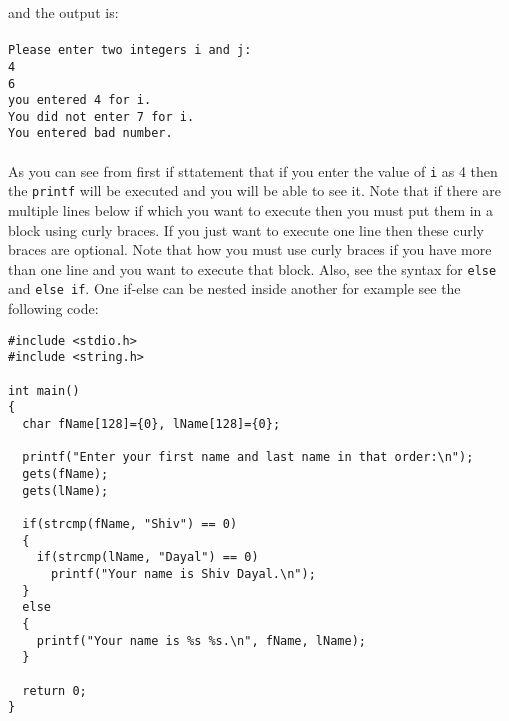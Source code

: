 and the output is:
\\\\\texttt{Please enter two integers i and j:\\
4\\
6\\
you entered 4 for i.\\
You did not enter 7 for i.\\
You entered bad number.\\\\}
As you can see from first if sttatement that if you enter the value of \texttt{i} as 4
then the \texttt{printf} will be executed and you will be able to see it. Note that if
there are multiple lines below if which you want to execute then you must put
them in a block using curly braces. If you just want to execute one line then
these curly braces are optional. Note that how you must use curly braces if you
have more than one line and you want to execute that block. Also, see the
syntax for \texttt{else} and \texttt{else if}. One if-else can be nested inside
another for example see the following code:

\begin{verbatim}
#include <stdio.h>
#include <string.h>
 
int main()
{
  char fName[128]={0}, lName[128]={0};
 
  printf("Enter your first name and last name in that order:\n");
  gets(fName);
  gets(lName);
 
  if(strcmp(fName, "Shiv") == 0)
  {
    if(strcmp(lName, "Dayal") == 0)
      printf("Your name is Shiv Dayal.\n");
  }
  else
  {
    printf("Your name is %s %s.\n", fName, lName);
  }
 
  return 0;
}
\end{verbatim}


